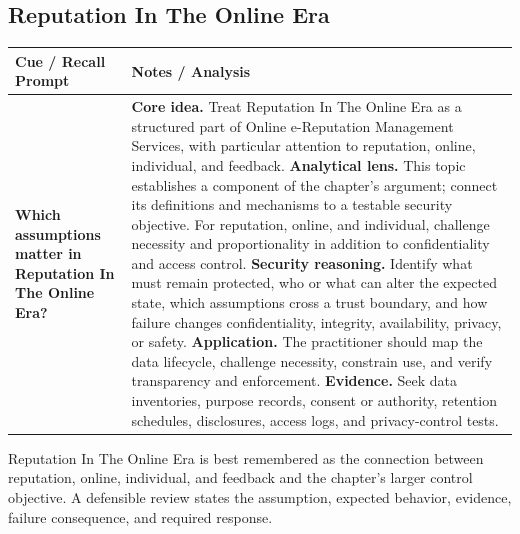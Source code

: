 \documentclass[11pt]{article}
\newcommand{\CornellHeader}{%
\rowcolor{Navy}\color{white}\bfseries Cue / Recall Prompt & \color{white}\bfseries Notes / Analysis\\\hline}
\newcommand{\CornellRow}[2]{%
\cellcolor{CueGray}\RaggedRight\textbf{#1} & \RaggedRight #2\\\hline}
\begin{document}
\subsection*{Reputation In The Online Era}
\begin{longtable}{>{\RaggedRight\arraybackslash}p{}|>{\RaggedRight\arraybackslash}p{}}
\CornellHeader
\CornellRow{Which assumptions matter in Reputation In The Online Era?}{\textbf{Core idea.} Treat Reputation In The Online Era as a structured part of Online e-Reputation Management Services, with particular attention to reputation, online, individual, and feedback. \textbf{Analytical lens.} This topic establishes a component of the chapter's argument; connect its definitions and mechanisms to a testable security objective. For reputation, online, and individual, challenge necessity and proportionality in addition to confidentiality and access control. \textbf{Security reasoning.} Identify what must remain protected, who or what can alter the expected state, which assumptions cross a trust boundary, and how failure changes confidentiality, integrity, availability, privacy, or safety. \textbf{Application.} The practitioner should map the data lifecycle, challenge necessity, constrain use, and verify transparency and enforcement. \textbf{Evidence.} Seek data inventories, purpose records, consent or authority, retention schedules, disclosures, access logs, and privacy-control tests.}
\end{longtable}
\begin{topicsummary}
Reputation In The Online Era is best remembered as the connection between reputation, online, individual, and feedback and the chapter's larger control objective. A defensible review states the assumption, expected behavior, evidence, failure consequence, and required response.
\end{topicsummary}
\end{document}
